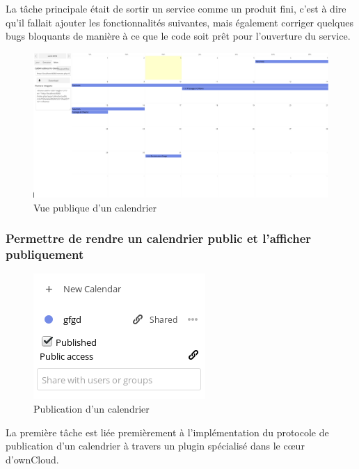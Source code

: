 \documentclass[10pt,a4paper, twoside]{report}
\begin{document}
	La tâche principale était de sortir un service comme un produit fini, c'est à dire qu'il fallait ajouter les fonctionnalités suivantes, mais également corriger quelques bugs bloquants de manière à ce que le code soit prêt pour l'ouverture du service.
	
	\begin{figure}[h]
		\centering
		\centerline{\includegraphics[width=1.5\textwidth]{images/calendrier-vue-publique.png}}
		\caption{Vue publique d'un calendrier}
		\label{vue-publique-calendrier}
	\end{figure}
	
	\subsubsection{Permettre de rendre un calendrier public et l'afficher publiquement}
	
	\begin{figure}
		\begin{center}
		\includegraphics[width=0.3\paperwidth]{images/fonctionnalitepublie.png}
	\end{center}
		\caption{Publication d'un calendrier}
		\label{publication-calendrier}
	\end{figure}
	
	La première tâche est liée premièrement à l'implémentation du protocole de publication d'un calendrier à travers un plugin spécialisé dans le cœur d'ownCloud. 
	
\end{document}
